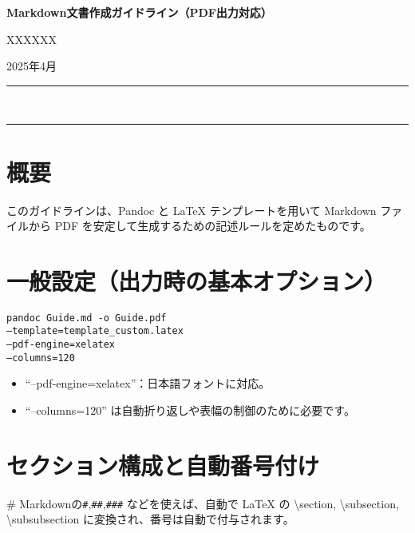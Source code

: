 \documentclass[
  12pt,
  a4paper,
  oneside,
]{article}
\providecommand{\tightlist}{%
  \setlength{\itemsep}{0pt}\setlength{\parskip}{0pt}
}
\begin{document}
\raggedbottom
\begin{center}
  {\huge\bfseries Markdown文書作成ガイドライン（PDF出力対応）} \par
        \vspace{1em}
    {\large XXXXXX} \par
        {\normalsize 2025年4月} \par
    \vspace{0.5em}
  {\color{gray!70}\rule{\textwidth}{0.5pt}}\\[-0.7em]
  {\color{gray!70}\rule{\textwidth}{0.5pt}}
\end{center}
\vspace{2em}

\section{概要}\label{ux6982ux8981}

このガイドラインは、Pandoc と LaTeX テンプレートを用いて Markdown ファイルから PDF を安定して生成するための記述ルールを定めたものです。

\section{一般設定（出力時の基本オプション）}\label{ux4e00ux822cux8a2dux5b9aux51faux529bux6642ux306eux57faux672cux30aaux30d7ux30b7ux30e7ux30f3}

\begin{CodeBlockBox}
\texttt{pandoc Guide.md -o Guide.pdf \\
  --template=template\_custom.latex \\
  --pdf-engine=xelatex \\
  --columns=120}
\end{CodeBlockBox}

\begin{itemize}
\tightlist
\item
  ``--pdf-engine=xelatex''：日本語フォントに対応。
\item
  ``--columns=120'' は自動折り返しや表幅の制御のために必要です。
\end{itemize}

\section{セクション構成と自動番号付け}\label{ux30bbux30afux30b7ux30e7ux30f3ux69cbux6210ux3068ux81eaux52d5ux756aux53f7ux4ed8ux3051}

\# Markdownの\verb|#|,\verb|##|\textbar,\verb|###|\textbar{} などを使えば、自動で LaTeX の \textbackslash section,
\textbackslash subsection, \textbackslash subsubsection に変換され、番号は自動で付与されます。
\end{document}

